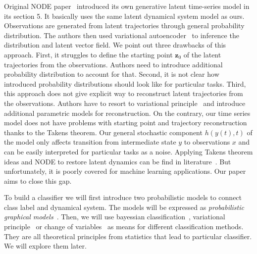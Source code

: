 \documentclass[referee, pdflatex, sn-mathphys-num]{sn-jnl}
\theoremstyle{definition}
\theoremstyle{plain}
\newcommand{\bz}{\ensuremath{\mathbf{z}}}
\begin{document}
		Original NODE paper~\cite{node} introduced its own generative latent time-series model in its section 5. It basically uses the same latent dynamical system model as ours. Observations are generated from latent trajectories through general probability distribution. The authors then used variational autoencoder~\cite{Kingma2013AutoEncodingVB} to inference the distribution and latent vector field. We point out three drawbacks of this approach. First, it struggles to define the starting point $\bz_0$ of the latent trajectories from the observations. Authors need to introduce additional probability distribution to account for that. Second, it is not clear how introduced probability distributions should look like for particular tasks. Third, this approach does not give explicit way to reconstruct latent trajectories from the observations. Authors have to resort to variational principle~\cite{blei2017variational} and introduce additional parametric models for reconstruction. On the contrary, our time series model does not have problems with starting point and trajectory reconstruction thanks to the Takens theorem. Our general stochastic component $h(y(t), t)$ of the model only affects transition from intermediate state $y$ to observations $x$ and can be easily interpreted for particular tasks as a noise. Applying Takens theorem ideas and NODE to restore latent dynamics can be find in literature~\cite{node_takens_1, node_takens_2}. But unfortunately, it is poorly covered for machine learning applications. Our paper aims to close this gap.
		
		
		To build a classifier we will first introduce two probabilistic models to connect class label and dynamical system. The models will be expressed as \textit{probabilistic graphical models}~\cite{bishop}. Then, we will use bayessian classification~\cite{bishop}, variational principle~\cite{blei2017variational} or change of variables~\cite{hogg2005introduction} as means for different classification methods. They are all theoretical principles from statistics that lead to particular classifier. We will explore them later. 
		
\end{document}
